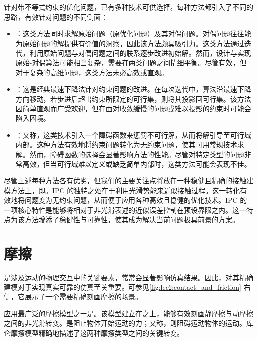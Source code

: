 针对带不等式约束的优化问题，已有多种技术可供选择。每种方法都引入了不同的思路，有效针对问题的不同侧面：
\begin{itemize}
  \item {}：这类方法同时求解原始问题（原优化问题）及其对偶问题。对偶问题往往能为原始问题的解提供有价值的洞察，因此该方法颇具吸引力。这类方法通过迭代，利用原始问题与对偶问题之间的联系逐步改进初始解。然而，设计与实现原始-对偶算法可能相当复杂，需要在两类问题之间精细平衡。尽管有效，但对于复杂的高维问题，这类方法未必高效或直观。
  \item {}：这是经典最速下降法针对约束问题的改进。在每次迭代中，算法沿最速下降方向移动，若步进后超出约束所限定的可行集，则将其投影回可行集。该方法因简单直观而广受欢迎，但在面对收敛缓慢的问题或难以投影的约束时可能会陷入困境。
  \item {}：又称，这类技术引入一个障碍函数来惩罚不可行解，从而将解引导至可行域内部。这种方法有效地将约束问题转化为无约束问题，使其可用常规技术求解。然而，障碍函数的选择会显著影响方法的性能。尽管对特定类型的问题非常高效，但当可行域难以定义或缺乏简单内部时，这类方法可能会表现不佳。
\end{itemize}

尽管上述每种方法各有优劣，但我们的主要关注点将放在一种稳健且精确的接触建模方法上，即。IPC 的独特之处在于利用光滑势能来近似接触过程。这一转化有效地将问题变为无约束问题，从而便于应用各种高效且稳健的优化技术。IPC 的一项核心特性是能够将相对于非光滑表述的近似误差控制在预设界限之内。这一特点为该方法增添了稳健性与可靠性，使其成为解决当前问题极具前景的方案。

\section{摩擦}
\label{sec:friction}

是涉及运动的物理交互中的关键要素，常常会显著影响仿真结果。因此，对其精确建模对于实现真实可靠的仿真至关重要。可参见\cref{fig:lec2:contact_and_friction} 右侧，它展示了一个需要精确刻画摩擦的场景。

应用最广泛的摩擦模型之一是。该模型建立在之上，能够有效刻画静摩擦与动摩擦之间的非光滑转变。是阻止物体开始运动的力；又称，则阻碍运动物体的运动。库仑摩擦模型精确地描述了这两种摩擦类型之间的关键转变。

